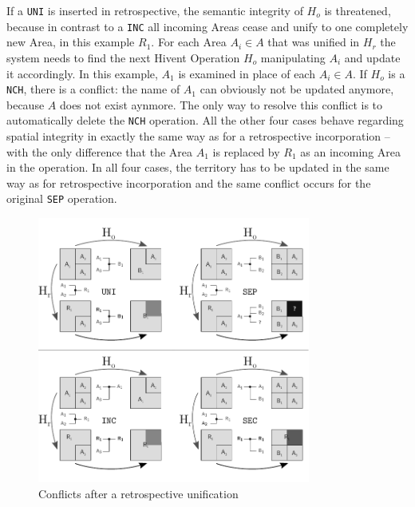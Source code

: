 If a \texttt{UNI} is inserted in retrospective, the semantic integrity of $H_o$ is threatened, because in contrast to a \texttt{INC} all incoming Areas cease and unify to one completely new Area, in this example $R_1$. For each Area $A_i \in A$ that was unified in $H_r$ the system needs to find the next Hivent Operation $H_o$ manipulating $A_i$ and update it accordingly. In this example, $A_1$ is examined in place of each $A_i \in A$. If $H_o$ is a \texttt{NCH}, there is a conflict: the name of $A_1$ can obviously not be updated anymore, because $A$ does not exist aynmore. The only way to resolve this conflict is to automatically delete the \texttt{NCH} operation. All the other four cases behave regarding spatial integrity in exactly the same way as for a retrospective incorporation -- with the only difference that the Area $A_1$ is replaced by $R_1$ as an incoming Area in the operation. In all four cases, the territory has to be updated in the same way as for retrospective incorporation and the same conflict occurs for the original \texttt{SEP} operation.

\begin{figure}[ht]
\vspace{1em}
  \centering
  \includegraphics[width=0.8\textwidth]{graphics/development/editing_hivent_data/retrospective_updates/UNI}
  \caption{Conflicts after a retrospective unification}
  \label{fig:update_conflict_UNI}
\end{figure}


